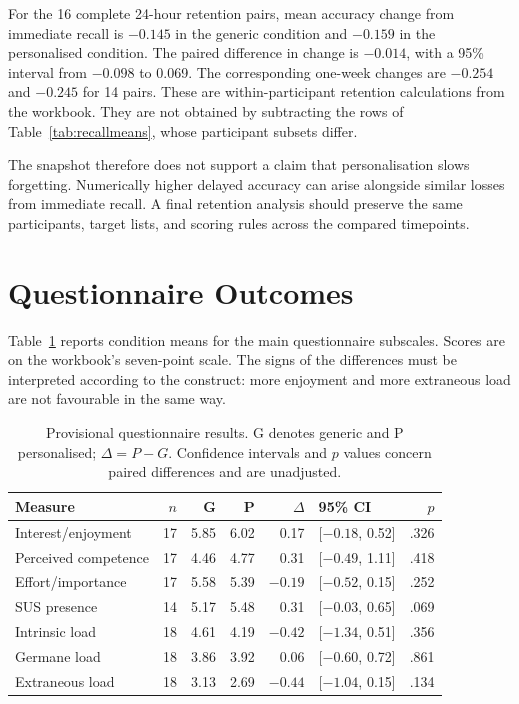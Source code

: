 For the 16 complete 24-hour retention pairs, mean accuracy change from immediate recall is $-0.145$ in the generic condition and $-0.159$ in the personalised condition. The paired difference in change is $-0.014$, with a 95\% interval from $-0.098$ to 0.069. The corresponding one-week changes are $-0.254$ and $-0.245$ for 14 pairs. These are within-participant retention calculations from the workbook. They are not obtained by subtracting the rows of Table~\ref{tab:recallmeans}, whose participant subsets differ.

The snapshot therefore does not support a claim that personalisation slows forgetting. Numerically higher delayed accuracy can arise alongside similar losses from immediate recall. A final retention analysis should preserve the same participants, target lists, and scoring rules across the compared timepoints.

\section{Questionnaire Outcomes}
Table~\ref{tab:questionnaires} reports condition means for the main questionnaire subscales. Scores are on the workbook's seven-point scale. The signs of the differences must be interpreted according to the construct: more enjoyment and more extraneous load are not favourable in the same way.

\begin{table}[htbp]
\centering
\small
\caption{Provisional questionnaire results. G denotes generic and P personalised; $\Delta=P-G$. Confidence intervals and $p$ values concern paired differences and are unadjusted.}
\label{tab:questionnaires}
\begin{tabular}{@{}lrrrrlr@{}}
\toprule
Measure & $n$ & G & P & $\Delta$ & 95\% CI & $p$ \\
\midrule
Interest/enjoyment & 17 & 5.85 & 6.02 & 0.17 & [$-0.18$, 0.52] & .326 \\
Perceived competence & 17 & 4.46 & 4.77 & 0.31 & [$-0.49$, 1.11] & .418 \\
Effort/importance & 17 & 5.58 & 5.39 & $-0.19$ & [$-0.52$, 0.15] & .252 \\
SUS presence & 14 & 5.17 & 5.48 & 0.31 & [$-0.03$, 0.65] & .069 \\
Intrinsic load & 18 & 4.61 & 4.19 & $-0.42$ & [$-1.34$, 0.51] & .356 \\
Germane load & 18 & 3.86 & 3.92 & 0.06 & [$-0.60$, 0.72] & .861 \\
Extraneous load & 18 & 3.13 & 2.69 & $-0.44$ & [$-1.04$, 0.15] & .134 \\
\bottomrule
\end{tabular}
\end{table}

